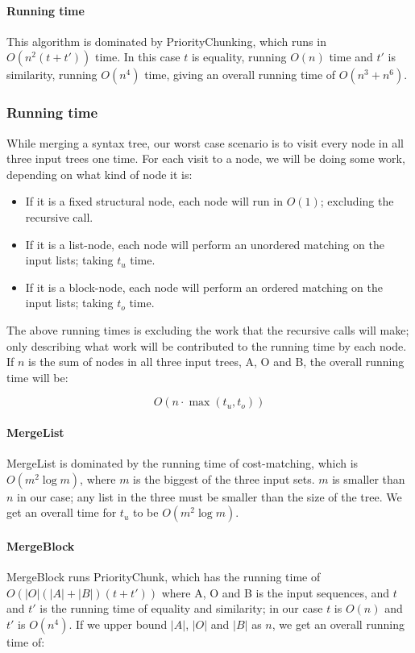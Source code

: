 \documentclass[11pt]{article}
\begin{document}
\paragraph{Running time} This algorithm is dominated by PriorityChunking, which runs in $O(n^2(t+t'))$ time. In this case $t$ is equality, running $O(n)$ time and $t'$ is similarity, running $O(n^4)$ time, giving an overall running time of $O(n^3+n^6)$.

\subsubsection{Running time}
While merging a syntax tree, our worst case scenario is to visit every node in all three input trees one time. For each visit to a node, we will be doing some work, depending on what kind of node it is:

\begin{itemize}
\item If it is a fixed structural node, each node will run in $O(1)$; excluding the recursive call.
\item If it is a list-node, each node will perform an unordered matching on the input lists; taking $t_u$ time.
\item If it is a block-node, each node will perform an ordered matching on the input lists; taking $t_o$ time.
\end{itemize}

The above running times is excluding the work that the recursive calls will make; only describing what work will be contributed to the running time by each node. If $n$ is the sum of nodes in all three input trees, A, O and B, the overall running time will be:

\begin{equation}
O(n \cdot \max(t_u, t_o)) \nonumber
\end{equation}

\paragraph{MergeList} MergeList is dominated by the running time of cost-matching, which is $O(m^2 \log m)$, where $m$ is the biggest of the three input sets. $m$ is smaller than $n$ in our case; any list in the three must be smaller than the size of the tree. We get an overall time for $t_u$ to be $O(m^2 \log m)$.

\paragraph{MergeBlock} MergeBlock runs PriorityChunk, which has the running time of $O(|O| (|A| + |B|)(t + t'))$ where A, O and B is the input sequences, and $t$ and $t'$ is the running time of equality and similarity; in our case $t$ is $O(n)$ and $t'$ is $O(n^4)$. If we upper bound $|A|$, $|O|$ and $|B|$ as $n$, we get an overall running time of:
\end{document}
